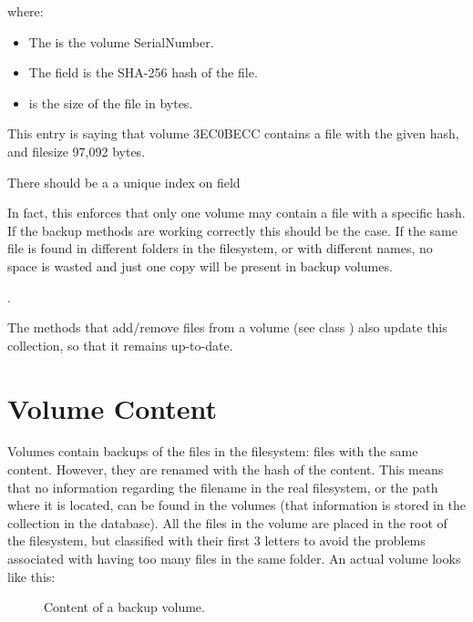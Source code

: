 \documentclass[letterpaper,10pt,english]{sphinxmanual}
\begin{document}
where:
\begin{itemize}
\item {} 
The  is the volume SerialNumber.

\item {} 
The  field is the SHA-256 hash of the file.

\item {} 
 is the size of the file in bytes.

\end{itemize}

This entry is saying that volume 3EC0BECC contains a file with the given hash, and filesize 97,092 bytes.

There should be a a unique index on field  %
\begin{footnote}[1]\sphinxAtStartFootnote
In fact, this enforces that only one volume may contain a file with a specific hash. If the backup
methods are working correctly this should be the case. If the same file is found in different
folders in the filesystem, or with different names, no space is wasted and just one copy will
be present in backup volumes.
%
\end{footnote} .

The methods that add/remove files from a volume (see class {\hyperref[\detokenize{index:fsbackup.hashVolume.HashVolume}]{}})
also update this collection, so that it remains up-to-date.


\chapter{Volume Content}
\label{\detokenize{index:volume-content}}
Volumes contain backups of the files in the filesystem: files with the same content. However, they are renamed with the hash of the content.
This means that no information regarding the filename in the real filesystem, or the path where it is located, can be found in the volumes (that information is stored in the  collection in the database).
All the files in the volume are placed in the root of the filesystem, but classified with their first 3 letters to avoid the problems associated with having too many files in the same folder.
An actual volume looks like this:
\begin{figure}[htbp]
\centering
\capstart

\noindent{}
\caption{Content of a backup volume.}\label{\detokenize{index:id8}}\end{figure}
\end{document}
